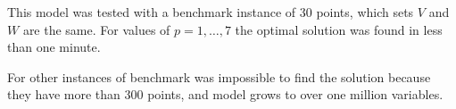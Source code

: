 \begin{frame}
  This model was tested with a benchmark instance of 30 points, 
  which sets $V$ and $W$ are the same.
  For values of $p = 1,\ldots,7$ the optimal solution was found in less than one minute.

  For other instances of benchmark was impossible to find the solution
  because they have more than 300 points, and model grows to over one million variables.
\end{frame}
